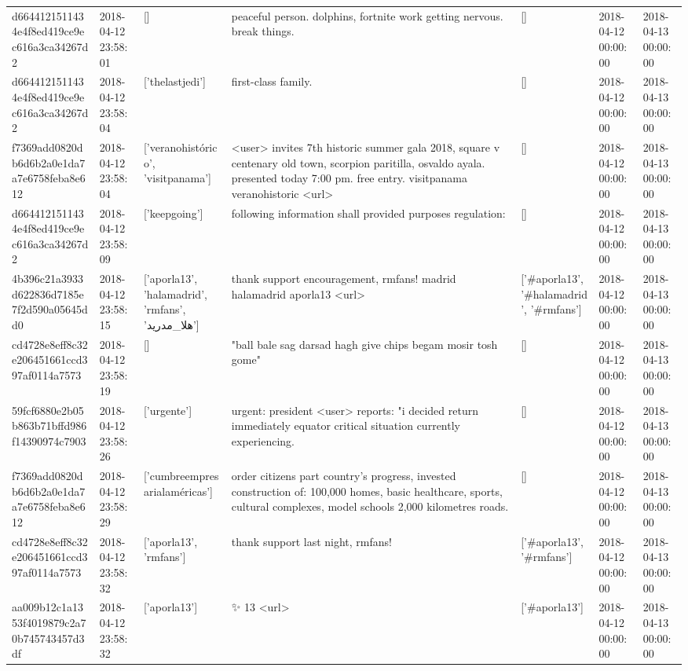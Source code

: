 \begin{tabular}{lllllll}
d6644121511434e4f8ed419ce9ec616a3ca34267d2 & 2018-04-12 23:58:01 & [] & peaceful person. dolphins, fortnite work getting nervous. break things. & [] & 2018-04-12 00:00:00 & 2018-04-13 00:00:00 \\
d6644121511434e4f8ed419ce9ec616a3ca34267d2 & 2018-04-12 23:58:04 & ['thelastjedi'] & first-class family. & [] & 2018-04-12 00:00:00 & 2018-04-13 00:00:00 \\
f7369add0820db6d6b2a0e1da7a7e6758feba8e612 & 2018-04-12 23:58:04 & ['veranohistórico', 'visitpanama'] & <user> invites 7th historic summer gala 2018, square v centenary old town, scorpion paritilla, osvaldo ayala. presented today 7:00 pm. free entry. visitpanama veranohistoric <url> & [] & 2018-04-12 00:00:00 & 2018-04-13 00:00:00 \\
d6644121511434e4f8ed419ce9ec616a3ca34267d2 & 2018-04-12 23:58:09 & ['keepgoing'] & following information shall provided purposes regulation: & [] & 2018-04-12 00:00:00 & 2018-04-13 00:00:00 \\
4b396c21a3933d622836d7185e7f2d590a05645dd0 & 2018-04-12 23:58:15 & ['aporla13', 'halamadrid', 'rmfans', 'هلا_مدريد'] & thank support encouragement, rmfans! madrid halamadrid aporla13 <url> & ['#aporla13', '#halamadrid', '#rmfans'] & 2018-04-12 00:00:00 & 2018-04-13 00:00:00 \\
cd4728e8eff8c32e206451661ccd397af0114a7573 & 2018-04-12 23:58:19 & [] & "ball bale sag darsad hagh give chips begam mosir tosh gome" & [] & 2018-04-12 00:00:00 & 2018-04-13 00:00:00 \\
59fcf6880e2b05b863b71bffd986f14390974c7903 & 2018-04-12 23:58:26 & ['urgente'] & urgent: president <user> reports: "i decided return immediately equator critical situation currently experiencing. & [] & 2018-04-12 00:00:00 & 2018-04-13 00:00:00 \\
f7369add0820db6d6b2a0e1da7a7e6758feba8e612 & 2018-04-12 23:58:29 & ['cumbreempresarialaméricas'] & order citizens part country's progress, invested construction of: 100,000 homes, basic healthcare, sports, cultural complexes, model schools 2,000 kilometres roads. & [] & 2018-04-12 00:00:00 & 2018-04-13 00:00:00 \\
cd4728e8eff8c32e206451661ccd397af0114a7573 & 2018-04-12 23:58:32 & ['aporla13', 'rmfans'] & thank support last night, rmfans! & ['#aporla13', '#rmfans'] & 2018-04-12 00:00:00 & 2018-04-13 00:00:00 \\
aa009b12c1a1353f4019879c2a70b745743457d3df & 2018-04-12 23:58:32 & ['aporla13'] & ✨ 13 <url> & ['#aporla13'] & 2018-04-12 00:00:00 & 2018-04-13 00:00:00 \\

\end{tabular}
